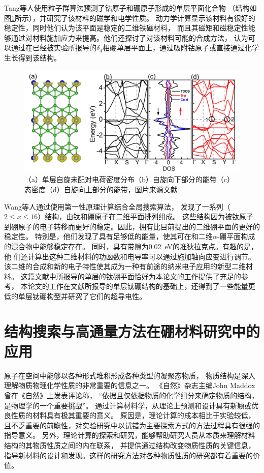 Tang等人\cite{tang2019cob}使用粒子群算法预测了钴原子和硼原子形成的单层平面化合物
（结构如图\ref{fig:ch1_cob6}所示），并研究了该材料的磁学和电学性质。
动力学计算显示该材料有很好的稳定性，同时他们认为该平面是稳定的二维铁磁材料，
而且其磁矩和磁稳定性能够通过对材料施加应力来提高。他们还探讨了对该材料可能的合成方法，
认为可以通过在已经被实验所报导的$\delta_4$相硼单层平面上，通过吸附钴原子或直接通过化学生长得到该结构。

\begin{figure}[bt]
  \includegraphics[width=1.0\textwidth]{figs/ch1_cob6.png}
  \centering
  \caption{（a）单层自旋未配对电荷密度分布（b）自旋向下部分的能带（c）态密度（d）自旋向上部分的能带，图片来源文献\cite{tang2019cob}}
  \label{fig:ch1_cob6}
\end{figure}

Wang等人\cite{wang2017semimetallic}通过使用第一性原理计算结合全局搜索算法，
发现了一系列（$2\leq x\leq 16$）结构，由钛和硼原子在二维平面排列组成。
这些结构因为被钛原子到硼原子的电子转移而更好的稳定。因此，拥有比目前提出的二维硼平面的更好的稳定性。
特别是，他们发现了具有足够低的能量，使其可在和二维$\alpha$-硼平面构成的混合物中能够稳定存在。
同时，具有带隙为\SI{0.02}{\eV}的准狄拉克点。有趣的是，他
们还计算出这种二维材料的功函数和电导率可以通过施加轴向应变进行调节。
该二维的合成和新的电子特性使其成为一种有前途的纳米电子应用的新型二维材料。
这篇文献中所报导的单层的钛硼平面恰好为本论文的工作提供了充足的参考，
本论文的工作在文献所报导的单层钛硼结构的基础上，还得到了一些能量更低的单层钛硼构型并研究了它们的超导电性。

\section{结构搜索与高通量方法在硼材料研究中的应用}

原子在空间中能够以各种形式堆积形成各种类型的凝聚态物质，
物质结构是深入理解物质物理化学性质的非常重要的信息之一。
《自然》杂志主编John Maddox曾在《自然》上发表评论称\cite{maddox1988crystals}，
“依据且仅依据物质的化学组分来确定物质的结构，是物理学的一个重要挑战”。
通过计算材料学，从理论上预测和设计具有新颖或优良性质的材料具有极其重要的意义。
原因是，理论计算的成本相比于实验较低，且不乏重要的前瞻性，对实验研究中以试错为主要探索方式的方法过程具有很强的指导意义。
另外，理论计算的探索和研究，能够帮助研究人员从本质来理解材料结构的其物质性质之间的内在联系，
并提供通过结构改变物质性质的关键信息，指导新材料的设计和发现。这样的研究方法对各种物质性质的研究都有着重要的价值。

